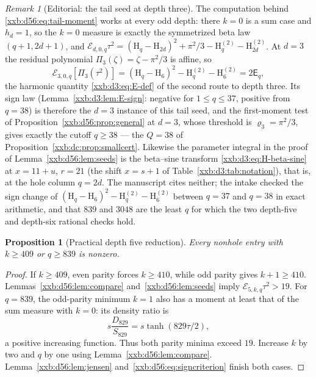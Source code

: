 \documentclass[11pt,a4paper]{article}
\numberwithin{equation}{section}
\newtheorem{proposition}[theorem]{Proposition}
\theoremstyle{definition}
\theoremstyle{remark}
\newtheorem{remark}[theorem]{Remark}
\theoremstyle{plain}
\begin{document}
\begin{remark}[Editorial: the tail seed at depth three]\label{xxb:d56:rem:d3}
The computation behind \eqref{xxb:d56:eq:tail-moment} works at every odd
depth: there $k=0$ is a sum case and $h_d=1$, so the $k=0$ measure is exactly
the symmetrized beta law $(q+1,2d+1)$, and
$\mathcal E_{d,0,q}\tau^2=(\mathrm H_q-\mathrm H_{2d})^2+\pi^2/3
-\mathrm H_q^{(2)}-\mathrm H_{2d}^{(2)}$.  At $d=3$ the residual polynomial
$\Pi_3(\zeta)=\zeta-\pi^2/3$ is affine, so
\[
 \mathcal E_{3,0,q}[\Pi_3(\tau^2)]
 =(\mathrm H_q-\mathrm H_6)^2-\mathrm H_q^{(2)}-\mathrm H_6^{(2)}
 =2\mathsf E_q,
\]
the harmonic quantity \eqref{xxb:d3:eq:E-def} of the second route to depth
three.  Its sign law (Lemma~\ref{xxb:d3:lem:E-sign}: negative for
$1\le q\le37$, positive from $q=38$) is therefore the $d=3$ instance of this
tail seed, and the first-moment test of
Proposition~\ref{xxb:d56:prop:general} at $d=3$, whose threshold is
$\varrho_3=\pi^2/3$, gives exactly the cutoff $q\ge38$ --- the $Q=38$ of
Proposition~\ref{xxb:dc:prop:smallcert}.  Likewise the parameter integral in
the proof of Lemma~\ref{xxb:d56:lem:seeds} is the beta--sine transform
\eqref{xxb:d3:eq:H-beta-sine} at $x=11+u$, $r=21$ (the shift $x=s+1$ of
Table~\ref{xxb:d3:tab:notation}), that is, at the hole column $q=2d$.  The
manuscript cites neither; the intake checked the sign change of
$(\mathrm H_q-\mathrm H_6)^2-\mathrm H_q^{(2)}-\mathrm H_6^{(2)}$ between
$q=37$ and $q=38$ in exact arithmetic, and that $839$ and $3048$ are the least
$q$ for which the two depth-five and depth-six rational checks hold.
\end{remark}

\begin{proposition}[Practical depth five reduction]\label{xxb:d56:prop:reduction}
Every nonhole entry with $k\ge409$ or $q\ge839$ is nonzero.
\end{proposition}
\begin{proof}
If $k\ge409$, even parity forces $k\ge410$, while odd parity gives
$k+1\ge410$. Lemmas~\ref{xxb:d56:lem:compare} and~\ref{xxb:d56:lem:seeds}
imply $\mathcal E_{5,k,q}\tau^2>19$.
For $q=839$, the odd-parity minimum $k=1$ also has a moment at least that of
the sum measure with $k=0$: its density ratio is
\[
 s\frac{D_{829}}{S_{829}}=s\tanh(829\tau/2),
\]
a positive increasing function. Thus both parity minima exceed $19$. Increase
$k$ by two and $q$ by one using Lemma~\ref{xxb:d56:lem:compare}.
Lemma~\ref{xxb:d56:lem:jensen} and~\eqref{xxb:d56:eq:signcriterion} finish
both cases.
\end{proof}
\end{document}
